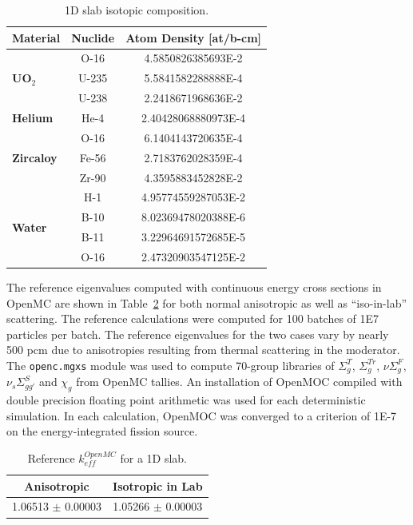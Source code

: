 \begin{table}[h!]
  \centering
  \caption[1D slab isotopic composition]{1D slab isotopic composition.}
  \small
  \label{table:chap4-slab-isotopes} 
  \vspace{6pt}
  \begin{tabular}{b c c}
  \toprule
  \rowcolor{lightgray}
  {\bf Material} &
  {\bf Nuclide} &
  {\bf Atom Density [at/b-cm]} \\
  \midrule
  \multirow{3}{*}{\bf UO$_2$} & O-16 &  4.5850826385693E-2 \\
  & U-235 & 5.5841582288888E-4 \\
  & U-238 & 2.2418671968636E-2 \\
  \midrule
  \multirow{1}{*}{\bf Helium} & He-4 & 2.40428068880973E-4 \\
  \midrule
  \multirow{3}{*}{\bf Zircaloy} & O-16 &  6.1404143720635E-4 \\
  & Fe-56 & 2.7183762028359E-4 \\
  & Zr-90 & 4.3595883452828E-2 \\
  \midrule
  \multirow{4}{*}{\bf Water} & H-1 &  4.95774559287053E-2 \\
  & B-10 & 8.02369478020388E-6 \\
  & B-11 & 3.22964691572685E-5 \\
  & O-16 & 2.47320903547125E-2 \\
  \bottomrule
\end{tabular}
\end{table}

The reference eigenvalues computed with continuous energy cross sections in OpenMC are shown in Table~\ref{table:chap4-slab-reference} for both normal anisotropic as well as ``iso-in-lab'' scattering. The reference calculations were computed for 100 batches of 1E7 particles per batch. The reference eigenvalues for the two cases vary by nearly 500 pcm due to anisotropies resulting from thermal scattering in the moderator. The \texttt{openc.mgxs} module was used to compute 70-group libraries of $\Sigma^T_g$, $\Sigma^{Tr}_g$, $\nu\Sigma^F_g$, $\nu_s\Sigma^S_{gg'}$ and $\chi_g$ from OpenMC tallies. An installation of OpenMOC compiled with double precision floating point arithmetic was used for each deterministic simulation. In each calculation, OpenMOC was converged to a criterion of 1E-7 on the energy-integrated fission source.

\begin{table}[h!]
  \centering
  \caption[Reference $k^{OpenMC}_{eff}$ for a 1D slab]{Reference $k^{OpenMC}_{eff}$ for a 1D slab.}
  \small
  \label{table:chap4-slab-reference} 
  \vspace{6pt}
  \begin{tabular}{c c}
  \toprule
  \rowcolor{lightgray}
  {\bf Anisotropic} &
  {\bf Isotropic in Lab} \\
  \midrule
  1.06513 $\pm$ 0.00003 & 1.05266 $\pm$ 0.00003 \\
  \bottomrule
\end{tabular}
\end{table}

